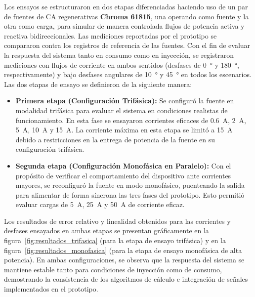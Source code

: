\documentclass[12pt, a4paper]{article} %
\begin{document}
\begin{description}[leftmargin=0pt]
  \item[Metodología de ensayo:] Los ensayos se estructuraron en dos etapas diferenciadas haciendo uso de un par de fuentes de CA regenerativas \textbf{Chroma 61815}, una operando como fuente y la otra como carga, para simular de manera controlada flujos de potencia activa y reactiva bidireccionales. Las mediciones reportadas por el prototipo se compararon contra los registros de referencia de las fuentes. Con el fin de evaluar la respuesta del sistema tanto en consumo como en inyección, se registraron mediciones con flujos de corriente en ambos sentidos (desfases de \qty{0}{\degree} y \qty{180}{\degree}, respectivamente) y bajo desfases angulares de \qty{10}{\degree} y \qty{45}{\degree} en todos los escenarios. Las dos etapas de ensayo se definieron de la siguiente manera:
        \begin{itemize}
          \item \textbf{Primera etapa (Configuración Trifásica):} Se configuró la fuente en modalidad trifásica para evaluar el sistema en condiciones realistas de funcionamiento. En esta fase se ensayaron corrientes eficaces de \qty{0.6}{\ampere}, \qty{2}{\ampere}, \qty{5}{\ampere}, \qty{10}{\ampere} y \qty{15}{\ampere}. La corriente máxima en esta etapa se limitó a \qty{15}{\ampere} debido a restricciones en la entrega de potencia de la fuente en su configuración trifásica.
          \item \textbf{Segunda etapa (Configuración Monofásica en Paralelo):} Con el propósito de verificar el comportamiento del dispositivo ante corrientes mayores, se reconfiguró la fuente en modo monofásico, puenteando la salida para alimentar de forma síncrona las tres fases del prototipo. Esto permitió evaluar cargas de \qty{5}{\ampere}, \qty{25}{\ampere} y \qty{50}{\ampere} de corriente eficaz.
        \end{itemize}

  \item[Resultados de los ensayos:] Los resultados de error relativo y linealidad obtenidos para las corrientes y desfases ensayados en ambas etapas se presentan gráficamente en la figura~\ref{fig:resultados_trifasica} (para la etapa de ensayo trifásica) y en la figura~\ref{fig:resultados_monofasica} (para la etapa de ensayo monofásica de alta potencia). En ambas configuraciones, se observa que la respuesta del sistema se mantiene estable tanto para condiciones de inyección como de consumo, demostrando la consistencia de los algoritmos de cálculo e integración de señales implementados en el prototipo.
\end{description}
\end{document}
